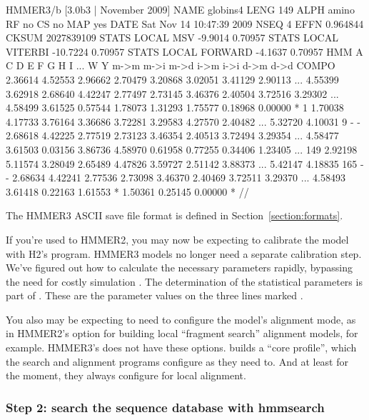 \begin{sreoutput}
HMMER3/b [3.0b3 | November 2009]
NAME  globins4
LENG  149
ALPH  amino
RF    no
CS    no
MAP   yes
DATE  Sat Nov 14 10:47:39 2009
NSEQ  4
EFFN  0.964844
CKSUM 2027839109
STATS LOCAL MSV       -9.9014  0.70957
STATS LOCAL VITERBI  -10.7224  0.70957
STATS LOCAL FORWARD   -4.1637  0.70957
HMM          A        C        D        E        F        G        H        I    ...     W        Y   
            m->m     m->i     m->d     i->m     i->i     d->m     d->d
  COMPO   2.36614  4.52553  2.96662  2.70479  3.20868  3.02051  3.41129  2.90113 ...  4.55399  3.62918
          2.68640  4.42247  2.77497  2.73145  3.46376  2.40504  3.72516  3.29302 ...  4.58499  3.61525
          0.57544  1.78073  1.31293  1.75577  0.18968  0.00000        *
      1   1.70038  4.17733  3.76164  3.36686  3.72281  3.29583  4.27570  2.40482 ...  5.32720  4.10031      9 - -
          2.68618  4.42225  2.77519  2.73123  3.46354  2.40513  3.72494  3.29354 ...  4.58477  3.61503
          0.03156  3.86736  4.58970  0.61958  0.77255  0.34406  1.23405
...
    149   2.92198  5.11574  3.28049  2.65489  4.47826  3.59727  2.51142  3.88373 ...  5.42147  4.18835    165 - -
          2.68634  4.42241  2.77536  2.73098  3.46370  2.40469  3.72511  3.29370 ...  4.58493  3.61418
          0.22163  1.61553        *  1.50361  0.25145  0.00000        *
//
\end{sreoutput}

The HMMER3 ASCII save file format is defined in
Section~\ref{section:formats}.

If you're used to HMMER2, you may now be expecting to calibrate the
model with H2's  program. HMMER3 models no longer
need a separate calibration step. We've figured out how to calculate
the necessary parameters rapidly, bypassing the need for costly
simulation \citep{Eddy08}. The determination of the statistical
parameters is part of . These are the parameter values
on the three lines marked .

You also may be expecting to need to configure the model's alignment
mode, as in HMMER2's  option for building local
``fragment search'' alignment models, for example. HMMER3's
 does not have these options.  builds a
``core profile'', which the search and alignment programs configure as
they need to. And at least for the moment, they always configure for
local alignment.


\subsubsection{Step 2: search the sequence database with hmmsearch}

